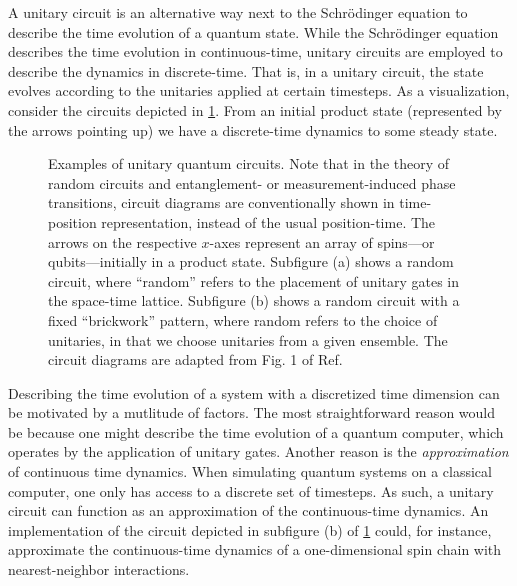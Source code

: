 A unitary circuit is an alternative way next to the Schr\"odinger equation to
describe the time evolution of a quantum state. While the Schr\"odinger
equation describes the time evolution in continuous-time, unitary circuits are
employed to describe the dynamics in discrete-time. That is, in a unitary
circuit, the state evolves according to the unitaries applied at certain
timesteps. As a visualization, consider the circuits depicted in
\cref{fig:random-brickwork}. From an initial product state (represented by the
arrows pointing up) we have a discrete-time dynamics to some steady state.
%
\begin{figure}[t]
  \centering
  \begin{subfigure}{0.42\textwidth}
    
  \end{subfigure}
  \hfill
  \begin{subfigure}{0.42\textwidth}
    
  \end{subfigure}
  \caption{Examples of unitary quantum circuits. Note that in the theory of
    random circuits and entanglement- or measurement-induced phase transitions,
    circuit diagrams are conventionally shown in time-position representation,
    instead of the usual position-time. The arrows on the respective $x$-axes
    represent an array of spins---or qubits---initially in a product state.
    Subfigure (a) shows a random circuit,
    where \enquote{random} refers to the placement of unitary gates in the
    space-time lattice. Subfigure (b) shows a random circuit with a fixed
    \enquote{brickwork} pattern, where random refers to the choice of
    unitaries, in that we choose unitaries from a given ensemble. The circuit
    diagrams are adapted from Fig. 1 of Ref. \cite{skinnerLectureNotesIntroduction2023}}
  \label{fig:random-brickwork}
\end{figure}
%
Describing the time evolution of a system with a discretized time dimension can
be motivated by a mutlitude of factors. The most straightforward reason would
be because one might describe the time evolution of a quantum computer, which
operates by the application of unitary gates. Another reason is the
\emph{approximation} of continuous time dynamics. When simulating quantum
systems on a classical computer, one only has access to a discrete set of
timesteps. As such, a unitary circuit can function as an approximation of the
continuous-time dynamics. An implementation of the circuit depicted in
subfigure (b) of \cref{fig:random-brickwork} could, for instance, approximate
the continuous-time dynamics of a one-dimensional spin chain with
nearest-neighbor interactions.


